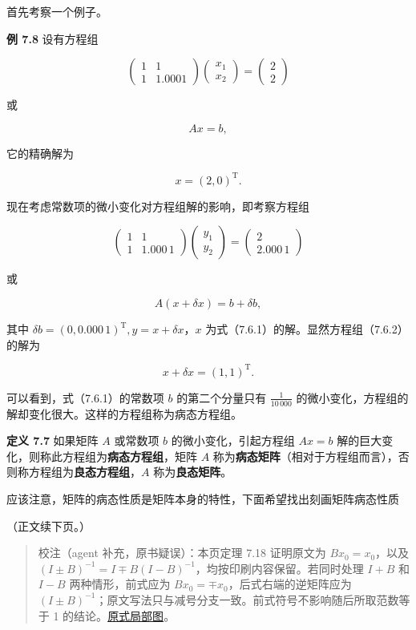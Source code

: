 首先考察一个例子。

\textbf{例 7.8} 设有方程组

\[
\begin{pmatrix}1&1\\1&1.0001\end{pmatrix}
\begin{pmatrix}x_1\\x_2\end{pmatrix}
=\begin{pmatrix}2\\2\end{pmatrix}
\]

或

\[
Ax=b,
\tag{7.6.1}
\]

它的精确解为

\[
x=(2,0)^{\mathrm T}.
\]

现在考虑常数项的微小变化对方程组解的影响，即考察方程组

\[
\begin{pmatrix}1&1\\1&1.000\,1\end{pmatrix}
\begin{pmatrix}y_1\\y_2\end{pmatrix}
=\begin{pmatrix}2\\2.000\,1\end{pmatrix}
\]

或

\[
A(x+\delta x)=b+\delta b,
\tag{7.6.2}
\]

其中 \(\delta b=(0,0.000\,1)^{\mathrm T},y=x+\delta x\)，\(x\) 为式（7.6.1）的解。显然方程组（7.6.2）的解为

\[
x+\delta x=(1,1)^{\mathrm T}.
\]

可以看到，式（7.6.1）的常数项 \(b\) 的第二个分量只有 \(\frac1{10\,000}\) 的微小变化，方程组的解却变化很大。这样的方程组称为病态方程组。

\textbf{定义 7.7} 如果矩阵 \(A\) 或常数项 \(b\) 的微小变化，引起方程组 \(Ax=b\) 解的巨大变化，则称此方程组为\textbf{病态方程组}，矩阵 \(A\) 称为\textbf{病态矩阵}（相对于方程组而言），否则称方程组为\textbf{良态方程组}，\(A\) 称为\textbf{良态矩阵}。

应该注意，矩阵的病态性质是矩阵本身的特性，下面希望找出刻画矩阵病态性质

（正文续下页。）

\begin{quote}
校注（agent 补充，原书疑误）：本页定理 7.18 证明原文为 \(Bx_0=x_0\)，以及 \((I\pm B)^{-1}=I\mp B(I-B)^{-1}\)，均按印刷内容保留。若同时处理 \(I+B\) 和 \(I-B\) 两种情形，前式应为 \(Bx_0=\mp x_0\)，后式右端的逆矩阵应为 \((I\pm B)^{-1}\)；原文写法只与减号分支一致。前式符号不影响随后所取范数等于 1 的结论。\href{verified/assets/ch07b/205-inverse-signs.png}{原式局部图}。
\end{quote}

